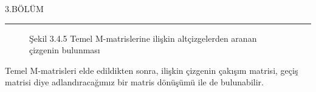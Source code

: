 \documentclass[11pt]{amsbook}
\begin{document}
\Large
3.BÖLÜM
\newline
\noindent\rule[0.5ex]{\linewidth}{1pt}

\begin{figure}[h!]
\scalebox{.6}{}
\centering
    \captionsetup{labelformat=empty}
   
    \caption{  \Large Şekil 3.4.5 Temel M-matrislerine ilişkin
    \newline
    altçizgelerden aranan çizgenin bulunması }
    \label{fig:my_label}


\end{figure}

\Large
Temel M-matrisleri elde edildikten sonra, ilişkin
\newline
çizgenin çakışım matrisi, geçiş matrisi diye
\newline
adlandıracağımız bir matris dönüşümü ile de
\newline
bulunabilir.
\end{document}
